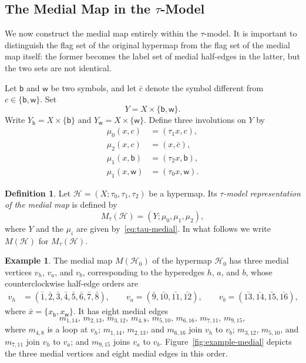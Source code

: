 \documentclass{article}
\theoremstyle{definition}
\newtheorem{definition}[theorem]{Definition}
\newtheorem{example}[theorem]{Example}
\theoremstyle{remark}
\newcommand{\Hcal}{\mathcal{H}}
\begin{document}
\subsection{The Medial Map in the $\tau$-Model}

We now construct the medial map entirely within the $\tau$-model. It is important to distinguish the flag set of the original hypermap from the flag set of the medial map itself: the former becomes the label set of medial half-edges in the latter, but the two sets are not identical.

Let $\mathsf b$ and $\mathsf w$ be two symbols, and let $\bar c$ denote the symbol different from $c\in\{\mathsf b,\mathsf w\}$. Set
\[
  Y=X\times\{\mathsf b,\mathsf w\}.
\]
Write $Y_{\mathsf b}=X\times\{\mathsf b\}$ and $Y_{\mathsf w}=X\times\{\mathsf w\}$. Define three involutions on $Y$ by
\[
\begin{aligned}
 \mu_0(x,c)&=(\tau_1x,c),\\
 \mu_2(x,c)&=(x,\bar c),\\
 \mu_1(x,\mathsf b)&=(\tau_2x,\mathsf b),\\
 \mu_1(x,\mathsf w)&=(\tau_0x,\mathsf w).
\end{aligned}
\tag{M}\label{eq:tau-medial}
\]

\begin{definition}\label{def:tau-medial}
Let $\Hcal=(X;\tau_0,\tau_1,\tau_2)$ be a hypermap. Its \emph{$\tau$-model representation of the medial map} is defined by
\[
 M_\tau(\Hcal)=(Y;\mu_0,\mu_1,\mu_2),
\]
where $Y$ and the $\mu_i$ are given by~\eqref{eq:tau-medial}. In what follows we write $M(\Hcal)$ for $M_\tau(\Hcal)$.
\end{definition}

\begin{example}
The medial map $M(\Hcal_0)$ of the hypermap $\Hcal_0$ has three medial vertices $v_h$, $v_a$, and $v_b$, corresponding to the hyperedges $h$, $a$, and $b$, whose counterclockwise half-edge orders are
\[
\begin{aligned}
v_h&=(\bar{1},\bar{2},\bar{3},\bar{4},\bar{5},\bar{6},\bar{7},\bar{8}),\qquad
v_a=(\bar{9},\bar{10},\bar{11},\bar{12}),\qquad
v_b=(\bar{13},\bar{14},\bar{15},\bar{16}),
\end{aligned}
\]
where $\bar x=\{x_{\mathsf b},x_{\mathsf w}\}$. It has eight medial edges
\[
m_{1,14},\,m_{2,13},\,m_{3,12},\,m_{4,8},\,
m_{5,10},\,m_{6,16},\,m_{7,11},\,m_{9,15},
\]
where $m_{4,8}$ is a loop at $v_h$; $m_{1,14}$, $m_{2,13}$, and $m_{6,16}$ join $v_h$ to $v_b$; $m_{3,12}$, $m_{5,10}$, and $m_{7,11}$ join $v_h$ to $v_a$; and $m_{9,15}$ joins $v_a$ to $v_b$.
Figure~\ref{fig:example-medial} depicts the three medial vertices and eight medial edges in this order. 
\end{example}
\end{document}
